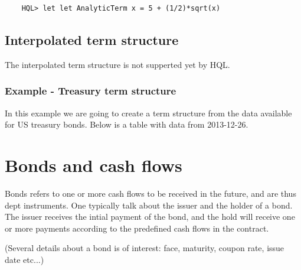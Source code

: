 \documentclass[11pt,a4paper]{article}
\numberwithin{equation}{section}
\begin{document}
	\begin{lstlisting}
	HQL> let let AnalyticTerm x = 5 + (1/2)*sqrt(x)
	\end{lstlisting}

	\subsection{Interpolated term structure}
	The interpolated term structure is not supperted yet by HQL.

	\subsubsection{Example - Treasury term structure}
	In this example we are going to create a term structure from the data available for
	US treasury bonds. Below is a table with data from 2013-12-26.





	\section{Bonds and cash flows}
	Bonds refers to one or more cash flows to be received in the future, and are thus dept instruments. One typically talk about the issuer and the holder of a bond. The issuer receives the intial payment of the bond, and the hold will receive one or more payments according to the predefined cash flows in the contract.

	(Several details about a bond is of interest: face, maturity, coupon rate, issue date etc...)
\end{document}
